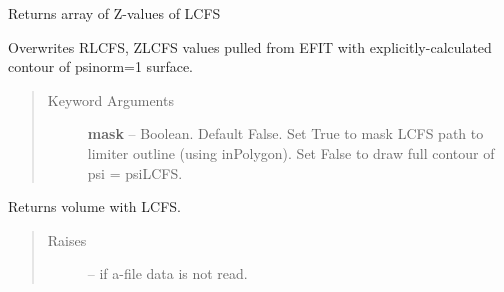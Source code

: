 \documentclass[letterpaper,10pt,english]{sphinxmanual}
\begin{document}
\begin{fulllineitems}

\begin{fulllineitems}
\label{eqtools:eqtools.eqdskreader.EqdskReader.getZLCFS}
Returns array of Z-values of LCFS

\end{fulllineitems}


\begin{fulllineitems}
\label{eqtools:eqtools.eqdskreader.EqdskReader.remapLCFS}
Overwrites RLCFS, ZLCFS values pulled from EFIT with explicitly-calculated contour
of psinorm=1 surface.
\begin{quote}\begin{description}
\item[{Keyword Arguments}] \leavevmode
\textbf{mask} --
Boolean.
Default False.  Set True to mask LCFS path to limiter outline (using inPolygon).
Set False to draw full contour of psi = psiLCFS.

\end{description}\end{quote}

\end{fulllineitems}


\begin{fulllineitems}
\label{eqtools:eqtools.eqdskreader.EqdskReader.getFluxVol}
\end{fulllineitems}


\begin{fulllineitems}
\label{eqtools:eqtools.eqdskreader.EqdskReader.getVolLCFS}
Returns volume with LCFS.
\begin{quote}\begin{description}
\item[{Raises}] \leavevmode
{} -- 
if a-file data is not read.

\end{description}\end{quote}


\end{fulllineitems}
\end{fulllineitems}
\end{document}
